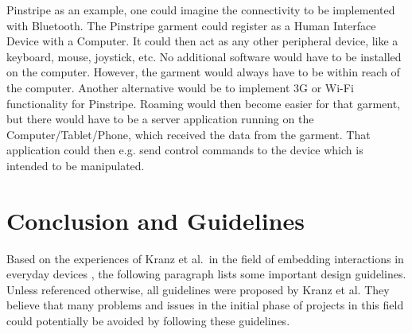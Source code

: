 Pinstripe as an example, one could imagine the connectivity to be implemented with Bluetooth.
The Pinstripe garment could register as a Human Interface Device with a Computer.
It could then act as any other peripheral device, like a keyboard, mouse, joystick, etc. 
No additional software would have to be installed on the computer. 
However, the garment would always have to be within reach of the computer.
Another alternative would be to implement 3G or Wi-Fi functionality for Pinstripe.
Roaming would then become easier for that garment, but there would have to be a server application running on the Computer/Tablet/Phone, which received the data from the garment. 
That application could then e.g. send control commands to the device which is intended to be manipulated.

\section{Conclusion and Guidelines}
\label{sec:conclusion}
Based on the experiences of Kranz et al.\ in the field of embedding interactions in everyday devices \cite{kranz10}, the following paragraph lists some important design guidelines.
Unless referenced otherwise, all guidelines were proposed by Kranz et al.
They believe that many problems and issues in the initial phase of projects in this field could potentially be avoided by following these guidelines.
